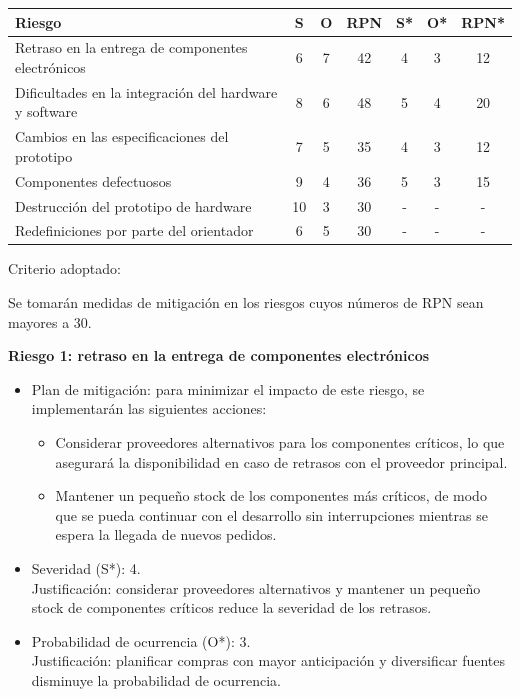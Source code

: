 \documentclass[
11pt, %
]{charter}
\begin{document}
\begin{table}[htpb]
\centering
\begin{tabularx}{\linewidth}{@{}|X|c|c|c|c|c|c|@{}}
\hline
\rowcolor[HTML]{C0C0C0} 
Riesgo & S & O & RPN & S* & O* & RPN* \\ \hline
Retraso en la entrega de componentes electrónicos & 6 & 7 & 42 & 4 & 3 & 12 \\ \hline
Dificultades en la integración del hardware y software & 8 & 6 & 48 & 5 & 4 & 20 \\ \hline
Cambios en las especificaciones del prototipo & 7 & 5 & 35 & 4 & 3 & 12 \\ \hline
Componentes defectuosos & 9 & 4 & 36 & 5 & 3 & 15 \\ \hline
Destrucción del prototipo de hardware & 10 & 3 & 30 & -& - & - \\ \hline
Redefiniciones por parte del orientador & 6 & 5 & 30 & - & -& - \\ \hline
\end{tabularx}%
\end{table}

Criterio adoptado:

Se tomarán medidas de mitigación en los riesgos cuyos números de RPN sean mayores a 30.


\textbf{Riesgo 1: retraso en la entrega de componentes electrónicos}
\begin{itemize}
	\item Plan de mitigación: para minimizar el impacto de este riesgo, se implementarán las siguientes acciones:
	\begin{itemize}
	    \item Considerar proveedores alternativos para los componentes críticos, lo que asegurará la disponibilidad en caso de retrasos con el proveedor principal.
    	\item Mantener un pequeño stock de los componentes más críticos, de modo que se pueda continuar con el desarrollo sin interrupciones mientras se espera la llegada de nuevos pedidos.
	\end{itemize}

    \item Severidad (S*): 4.\\
    Justificación: considerar proveedores alternativos y mantener un pequeño stock de componentes críticos reduce la severidad de los retrasos.
    \item Probabilidad de ocurrencia (O*): 3.\\
    Justificación: planificar compras con mayor anticipación y diversificar fuentes disminuye la probabilidad de ocurrencia.
\end{itemize}
\end{document}
